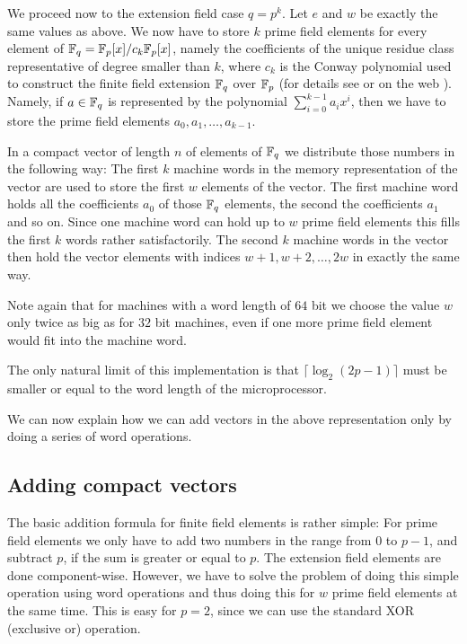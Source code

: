 We proceed now to the extension field case $q=p^k$. Let $e$ and $w$ be
exactly the same values as above. We now have to store $k$ prime field
elements for every element of $\mathbb{F}_q = \mathbb{F}_p[x]/c_k\mathbb{F}_p[x]$, namely the 
coefficients of the unique residue class representative of degree smaller 
than $k$, where $c_k$ is the Conway polynomial used to construct the 
finite field extension $\mathbb{F}_q$ over $\mathbb{F}_p$ (for details see \cite{Nickel}
or on the web \cite{ConwayFL}). Namely, if $a \in \mathbb{F}_q$ is represented by
the polynomial $\sum_{i=0}^{k-1} a_i x^i$, then we have to store the prime 
field elements $a_0, a_1, \ldots, a_{k-1}$. 

In a compact vector of length $n$ of elements of $\mathbb{F}_q$ we distribute
those numbers in the following way: The first $k$ machine words in the
memory representation of the vector are used to store the first $w$
elements of the vector. The first machine word holds all the coefficients
$a_0$ of those $\mathbb{F}_q$ elements, the second the coefficients $a_1$ and so
on. Since one machine word can hold up to $w$ prime field elements this
fills the first $k$ words rather satisfactorily. The second $k$ machine words
in the vector then hold the vector elements with indices 
$w+1, w+2, \ldots, 2w$ in exactly the same way.

Note again that for machines with a word length of $64$ bit we choose the
value $w$ only twice as big as for $32$ bit machines, even if one more
prime field element would fit into the machine word.

The only natural limit of this implementation is that 
$\lceil \log_2(2p-1) \rceil$ must be smaller or equal to the word length
of the microprocessor.

We can now explain how we can add vectors in the above representation
only by doing a series of word operations.

\subsection{Adding compact vectors}

The basic addition formula for finite field elements is rather simple:
For prime field elements we only have to add two numbers in the range 
from $0$ to $p-1$, and
subtract $p$, if the sum is greater or equal to $p$. The extension
field elements are done component-wise. However, we have to solve
the problem of doing this simple operation using word operations and 
thus doing this for $w$ prime field elements at the same time.
This is easy for $p=2$, since we can use the standard XOR (exclusive or)
operation.

